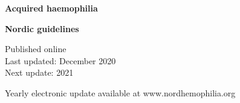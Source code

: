 
\begin{centering}

\vspace{3 cm}

\Huge

{\bf Acquired haemophilia}

\vspace{0.5 cm}

{\bf Nordic guidelines}

\vspace{3 cm}


\normalsize

Published online\\
Last updated: December 2020\\
Next update: 2021

\vspace{1 cm}

Yearly electronic update available at www.nordhemophilia.org

\end{centering}

\thispagestyle{empty}